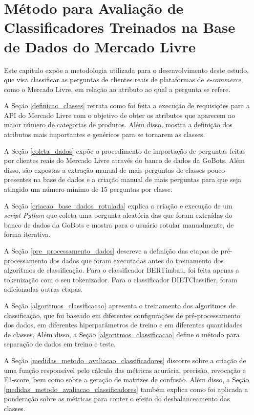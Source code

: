 \chapter{Método para Avaliação de Classificadores Treinados na Base de Dados do Mercado Livre}
\label{cap-desenvolvimento}
Este capítulo expõe a metodologia utilizada para o desenvolvimento deste estudo, que visa classificar as perguntas de clientes reais de plataformas de \textit{e-commerce}, como o Mercado Livre, em relação ao atributo ao qual a pergunta se refere.

A Seção \ref{definicao_classes} retrata como foi feita a execução de requisições para a API do Mercado Livre com o objetivo de obter os atributos que aparecem no maior número de categorias de produtos. Além disso, mostra a definição dos atributos mais importantes e genéricos para se tornarem as classes.

A Seção \ref{coleta_dados} expõe o procedimento de importação de perguntas feitas por clientes reais do Mercado Livre através do banco de dados da GoBots. Além disso, são expostas a extração manual de mais perguntas de classes pouco presentes na base de dados e a criação manual de mais perguntas para que seja atingido um número mínimo de 15 perguntas por classe.

A Seção \ref{criacao_base_dados_rotulada} explica a criação e execução de um \textit{script Python} que coleta uma pergunta aleatória das que foram extraídas do banco de dados da GoBots e mostra para o usuário rotular manualmente, de forma iterativa.

A Seção \ref{pre_processamento_dados} descreve a definição das etapas de pré-processamento dos dados que foram executadas antes do treinamento dos algoritmos de classificação. Para o classificador BERTimbau, foi feita apenas a tokenização com o seu tokenizador. Para o classificador DIETClassifier, foram adicionadas outras etapas.

A Seção \ref{algoritmos_classificacao} apresenta o treinamento dos algoritmos de classificação, que foi baseado em diferentes configurações de pré-processamento dos dados, em diferentes hiperparâmetros de treino e em diferentes quantidades de classes. Além disso, a Seção \ref{algoritmos_classificacao} define o método para separação de dados em treino e teste.

A Seção \ref{medidas_metodo_avaliacao_classificadores} discorre sobre a criação de uma função responsável pelo cálculo das métricas acurácia, precisão, revocação e F1-score, bem como sobre a geração de matrizes de confusão. Além disso, a Seção \ref{medidas_metodo_avaliacao_classificadores} também explica como foi aplicada a ponderação sobre as métricas para conter o efeito do desbalanceamento das classes.

